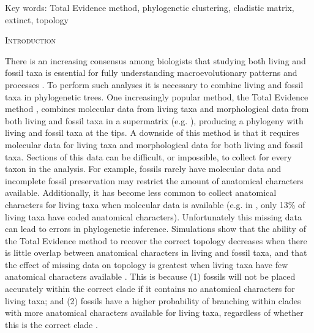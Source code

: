\documentclass[12pt,letterpaper]{article}
\renewcommand{\section}[1]{%
\bigskip
\begin{center}
\begin{Large}
\normalfont\scshape #1
\medskip
\end{Large}
\end{center}}
\begin{document}
\noindent Key words: Total Evidence method, phylogenetic clustering, cladistic matrix, extinct, topology\\

\vspace{1.5in}

%
%
\newpage 
\section{Introduction}

There is an increasing consensus among biologists that studying both living and fossil taxa is essential for fully understanding macroevolutionary patterns and processes \cite{slaterunifying2013,fritzdiversity2013}.
To perform such analyses it is necessary to combine living and fossil taxa in phylogenetic trees.
One increasingly popular method, the Total Evidence method \cite{ronquista2012}, combines molecular data from living taxa and morphological data %
 from both living and fossil taxa in a supermatrix (e.g. \cite{pyrondivergence2011,ronquista2012,schragocombining2013,slaterunifying2013,beckancient2014}), producing a phylogeny with living and fossil taxa at the tips. 
A downside of this method is that it requires molecular data for living taxa and morphological data for both living and fossil taxa. %
Sections of this data can be difficult, or impossible, to collect for every taxon in the analysis.
For example, fossils rarely have molecular data and incomplete fossil preservation may restrict the amount of anatomical characters available.
Additionally, it has become less common to collect anatomical characters for living taxa when molecular data is available (e.g. in \cite{slaterphylogenetic2013}, only 13\% of living taxa have coded anatomical characters).
Unfortunately this missing data can lead to errors in phylogenetic inference.
Simulations show that the ability of the Total Evidence method to recover the correct topology decreases when there is little overlap between anatomical characters in living and fossil taxa, and that the effect of missing data on topology is greatest when living taxa have few anatomical characters available \cite{GuillermeCooper}.
This is because (1) fossils will not be placed accurately within the correct clade if it contains no anatomical characters for living taxa; and (2) fossils have a higher probability of branching within clades with more anatomical characters available for living taxa, regardless of whether this is the correct clade \cite{GuillermeCooper}. 
\end{document}
